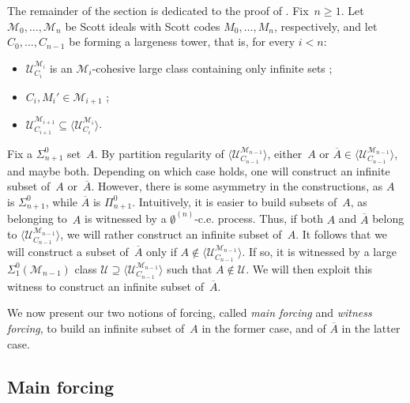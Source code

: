 \documentclass{article}
\def\U{\mathcal{U}}
\def\M{\mathcal{M}}
\newcommand{\ludovic}[1]{\textcolor{blue}{#1}}
\numberwithin{theorem}{section}
\theoremstyle{definition}
\begin{document}
The remainder of the section is dedicated to the proof of . Fix~$n \geq 1$.
Let $\M_0, \dots, \M_n$ be Scott ideals with Scott codes $M_0, \dots, M_n$, respectively, and let $C_0, \dots, C_{n-1}$ be forming a largeness tower, that is, for every $i < n$:
\begin{itemize}
    \item $\U_{C_i}^{\M_i}$ is an $\M_i$-cohesive large class containing only infinite sets ;
    \item $C_i,M_i' \in \M_{i+1}$ ;
    \item $\U_{C_{i+1}}^{\M_{i+1}} \subseteq \langle \U_{C_i}^{\M_i} \rangle$.
\end{itemize}
Fix a $\Sigma^0_{n+1}$ set~$A$. 
By partition regularity of $\langle \U_{C_{n-1}}^{\M_{n-1}} \rangle$, either~$A$ or $\overline{A} \in \langle \U_{C_{n-1}}^{\M_{n-1}} \rangle$, and maybe both. 
Depending on which case holds, one will construct an infinite subset of~$A$ or~$\overline{A}$. However, there is some asymmetry in the constructions, as $A$ is $\Sigma^0_{n+1}$, while $\overline{A}$ is $\Pi^0_{n+1}$. Intuitively, it is easier to build subsets of~$A$, as belonging to~$A$ is witnessed by a $\emptyset^{(n)}$-c.e. process. Thus, if both $A$ and $\overline{A}$ belong to $\langle \U_{C_{n-1}}^{\M_{n-1}} \rangle$, we will rather construct an infinite subset of~$A$. It follows that we will construct a subset of~$\overline{A}$ only if $A \not \in \langle \U_{C_{n-1}}^{\M_{n-1}} \rangle$. If so, it is witnessed by a large $\Sigma^0_1(\M_{n-1})$ class $\U \supseteq \langle \U_{C_{n-1}}^{\M_{n-1}} \rangle$ such that $A \not \in \U$. We will then exploit this witness to construct an infinite subset of~$\overline{A}$. 

We now present our two notions of forcing, called \emph{main forcing} and \emph{witness forcing}, to build an infinite subset of~$A$ in the former case, and of $\overline{A}$ in the latter case.


\subsection{Main forcing}\label{sect:main-forcing}
\end{document}
